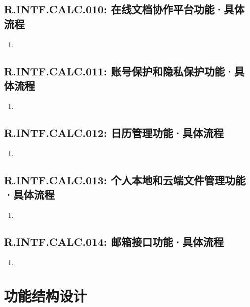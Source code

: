     \subsection{R.INTF.CALC.010: 在线文档协作平台功能·具体流程}
    \begin{enumerate}
        \item 
    \end{enumerate}
    \subsection{R.INTF.CALC.011: 账号保护和隐私保护功能·具体流程}
    \begin{enumerate}
        \item 
    \end{enumerate}
    \subsection{R.INTF.CALC.012: 日历管理功能·具体流程}
    \begin{enumerate}
        \item 
    \end{enumerate}
    \subsection{R.INTF.CALC.013: 个人本地和云端文件管理功能·具体流程}
    \begin{enumerate}
        \item 
    \end{enumerate}
    \subsection{R.INTF.CALC.014: 邮箱接口功能·具体流程}
    \begin{enumerate}
        \item 
    \end{enumerate}
\section{功能结构设计}

